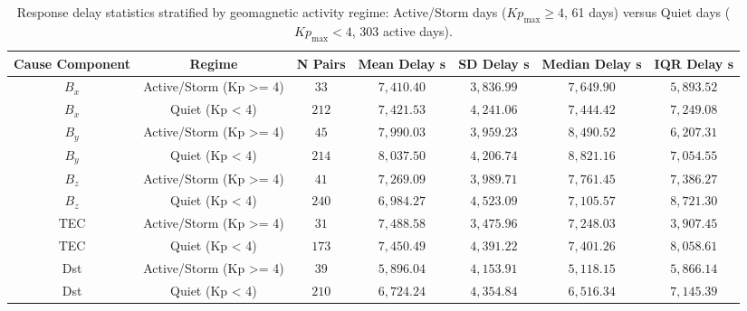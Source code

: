 \vspace{-3pt}
\begin{table}[H]
\caption{Response delay statistics stratified by geomagnetic activity regime: Active/Storm days ($Kp_{\max} \ge 4$, 61 days) versus Quiet days ($Kp_{\max} < 4$, 303 active days).\label{tab:Stratified_Delay_By_Kp_Regime}}
\begin{tabularx}{\textwidth}{CCCCCCC}
\toprule
\textbf{Cause Component} & \textbf{Regime} & \textbf{N Pairs} & \textbf{Mean Delay s} & \textbf{SD Delay s} & \textbf{Median Delay s} & \textbf{IQR Delay s} \\
\midrule
$B_x$ & Active/Storm (Kp >= 4) & $33$ & $7,410.40$ & $3,836.99$ & $7,649.90$ & $5,893.52$ \\
$B_x$ & Quiet (Kp < 4) & $212$ & $7,421.53$ & $4,241.06$ & $7,444.42$ & $7,249.08$ \\
$B_y$ & Active/Storm (Kp >= 4) & $45$ & $7,990.03$ & $3,959.23$ & $8,490.52$ & $6,207.31$ \\
$B_y$ & Quiet (Kp < 4) & $214$ & $8,037.50$ & $4,206.74$ & $8,821.16$ & $7,054.55$ \\
$B_z$ & Active/Storm (Kp >= 4) & $41$ & $7,269.09$ & $3,989.71$ & $7,761.45$ & $7,386.27$ \\
$B_z$ & Quiet (Kp < 4) & $240$ & $6,984.27$ & $4,523.09$ & $7,105.57$ & $8,721.30$ \\
TEC & Active/Storm (Kp >= 4) & $31$ & $7,488.58$ & $3,475.96$ & $7,248.03$ & $3,907.45$ \\
TEC & Quiet (Kp < 4) & $173$ & $7,450.49$ & $4,391.22$ & $7,401.26$ & $8,058.61$ \\
Dst & Active/Storm (Kp >= 4) & $39$ & $5,896.04$ & $4,153.91$ & $5,118.15$ & $5,866.14$ \\
Dst & Quiet (Kp < 4) & $210$ & $6,724.24$ & $4,354.84$ & $6,516.34$ & $7,145.39$ \\
\bottomrule
\end{tabularx}
\end{table}
\vspace{-3pt}
